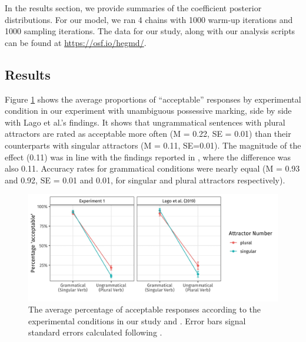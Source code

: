 \documentclass[]{interact}
\theoremstyle{plain}%
\theoremstyle{definition}
\theoremstyle{remark}
\begin{document}
In the results section, we provide summaries of the coefficient posterior distributions. For our model, we ran 4 chains with 1000 warm-up iterations and 1000 sampling iterations. The data for our study, along with our analysis scripts can be found at \url{https://osf.io/hegmd/}.

\subsection{Results}

Figure \ref{fig:AverageResponses} shows the average proportions of ``acceptable'' responses by experimental condition in our experiment with unambiguous possessive marking, side by side with Lago et al.'s findings. It shows that ungrammatical sentences with plural attractors are rated as acceptable more often (M = 0.22, SE = 0.01) than their counterparts with singular attractors (M = 0.11, SE=0.01). The magnitude of the effect (0.11) was in line with the findings reported in \citet{LagoEtAl:2019}, where the difference was also 0.11. Accuracy rates for grammatical conditions were nearly equal (M = 0.93 and 0.92, SE = 0.01 and 0.01, for singular and plural attractors respectively).


\begin{figure}[hbt!]
\centering

\includegraphics[width=\linewidth]{AverageResponses-1.jpg} 

\caption{The average percentage of acceptable responses according to the experimental conditions in our study and \citet{LagoEtAl:2019}. Error bars signal standard errors calculated following \citet{Morey:2008,Cousineau:2005}.}
\label{fig:AverageResponses}
\end{figure}
\end{document}
